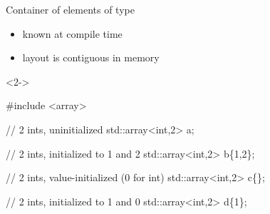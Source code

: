 \begin{frame}[fragile]{}
  \begin{columns}
    \begin{column}{.6\textwidth}

  Container of  elements of type 
  \begin{itemize}
  \item {} known at compile time
  \item layout is contiguous in memory
  \end{itemize}

\begin{codeblock}<2->{
#include <array>

// 2 ints, uninitialized
std::array<int,2> a;

// 2 ints, initialized to 1 and 2
std::array<int,2> b\{1,2\};

// 2 ints, value-initialized (0 for int)
std::array<int,2> c\{\};

// 2 ints, initialized to 1 and 0
std::array<int,2> d\{1\};

}\end{codeblock}

    \end{column}

    \begin{column}{.4\textwidth}


\end{column}
\end{columns}
\end{frame}
